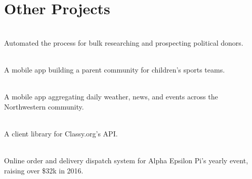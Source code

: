 
\section{Other Projects}

\\
Automated the process for bulk researching and prospecting political donors.
\sectionsep

\\
A mobile app building a parent community for  children's sports teams.
\sectionsep

\\
A mobile app aggregating daily weather, news, and events across the Northwestern community.
\sectionsep

\\
A client library for Classy.org's API.
\sectionsep

\\
Online order and delivery dispatch system for Alpha Epsilon Pi's yearly event, raising over \$32k in 2016.
\sectionsep
